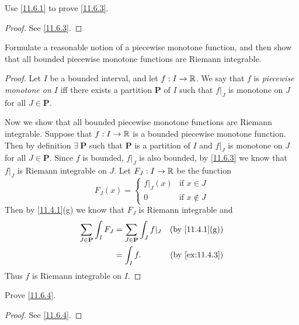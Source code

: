 \exercisesection

\begin{ex}\label{ex:11.6.1}
  Use \cref{11.6.1} to prove \cref{11.6.3}.
\end{ex}

\begin{proof}
  See \cref{11.6.3}.
\end{proof}

\begin{ex}\label{ex:11.6.2}
  Formulate a reasonable notion of a piecewise monotone function, and then show that all bounded piecewise monotone functions are Riemann integrable.
\end{ex}

\begin{proof}
  Let \(I\) be a bounded interval, and let \(f : I \to \mathbb{R}\).
  We say that \(f\) is \emph{piecewise monotone on \(I\)} iff there exists a partition \(\mathbf{P}\) of \(I\) such that \(f|_J\) is monotone on \(J\) for all \(J \in \mathbf{P}\).

  Now we show that all bounded piecewise monotone functions are Riemann integrable.
  Suppose that \(f : I \to \mathbb{R}\) is a bounded piecewise monotone function.
  Then by definition \(\exists\ \mathbf{P}\) such that \(\mathbf{P}\) is a partition of \(I\) and \(f|_J\) is monotone on \(J\) for all \(J \in \mathbf{P}\).
  Since \(f\) is bounded, \(f|_J\) is also bounded, by \cref{11.6.3} we know that \(f|_J\) is Riemann integrable on \(J\).
  Let \(F_J : I \to \mathbb{R}\) be the function
  \[
    F_J(x) = \begin{cases}
      f|_J(x) & \text{if } x \in J    \\
      0       & \text{if } x \notin J
    \end{cases}
  \]
  Then by \cref{11.4.1}(g) we know that \(F_J\) is Riemann integrable and
  \begin{align*}
    \sum_{J \in \mathbf{P}} \int_I F_J & = \sum_{J \in \mathbf{P}} \int_J f|_J & \text{(by \cref{11.4.1}(g))} \\
                                       & = \int_I f.                           & \text{(by \cref{ex:11.4.3})}
  \end{align*}
  Thus \(f\) is Riemann integrable on \(I\).
\end{proof}

\begin{ex}\label{ex:11.6.3}
  Prove \cref{11.6.4}.
\end{ex}

\begin{proof}
  See \cref{11.6.4}.
\end{proof}

